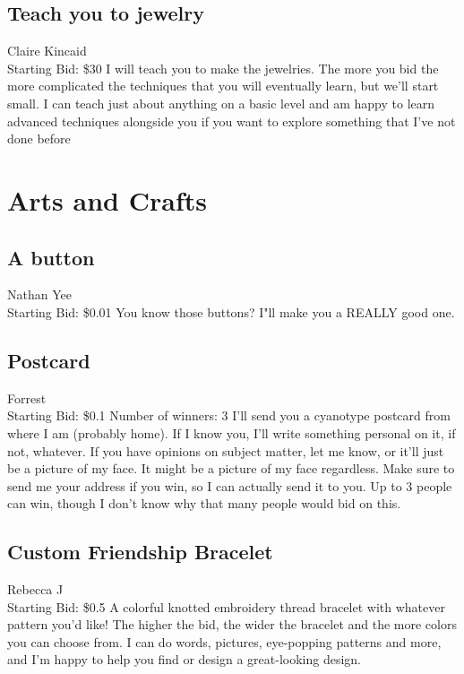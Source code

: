 \documentclass[11pt]{article}
\begin{document}
\subsection{Teach you to jewelry}
Claire Kincaid
\\
Starting Bid: \$30
\newline
I will teach you to make the jewelries.  The more you bid the more complicated the techniques that you will eventually learn, but we'll start small.  I can teach just about anything on a basic level and am happy to learn advanced techniques alongside you if you want to explore something that I've not done before
\section{Arts and Crafts}
\subsection{A button}
Nathan Yee
\\
Starting Bid: \$0.01
\newline
You know those buttons? I"ll make you a REALLY good one.
\subsection{Postcard}
Forrest
\\
Starting Bid: \$0.1
\newline
Number of winners: 3
\newline
I'll send you a cyanotype postcard from where I am (probably home). If I know you, I'll write something personal on it, if not, whatever. If you have opinions on subject matter, let me know, or it'll just be a picture of my face. It might be a picture of my face regardless. Make sure to send me your address if you win, so I can actually send it to you. Up to 3 people can win, though I don't know why that many people would bid on this.
\subsection{Custom Friendship Bracelet}
Rebecca J
\\
Starting Bid: \$0.5
\newline
A colorful knotted embroidery thread bracelet with whatever pattern you'd like! The higher the bid, the wider the bracelet and the more colors you can choose from. I can do words, pictures, eye-popping patterns and more, and I'm happy to help you find or design a great-looking design.
\end{document}
